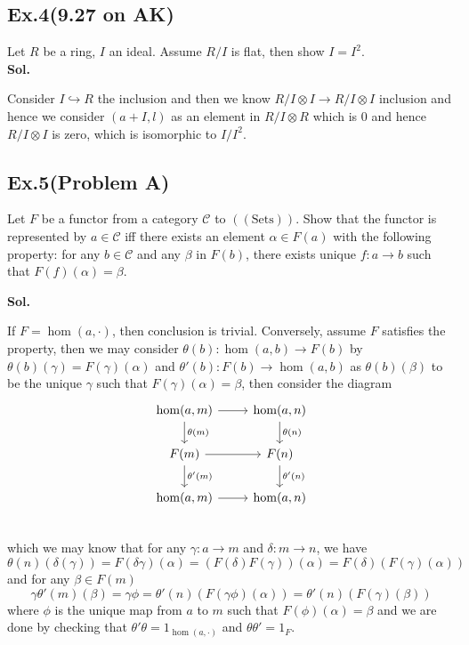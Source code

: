 \documentclass[lang=en,11pt,a4paper,citestyle =authoryear]{elegantpaper}
\begin{document}
\subsection*{Ex.4(9.27 on AK)} 
Let $R$ be a ring, $I$ an ideal. Assume $R/I$ is flat, then show $I = I^2$.
\vspace{0.5em}\\
\textbf{Sol.} \par
Consider $I\hookrightarrow R$ the inclusion and then we know $R/I \otimes I \to R/I \otimes I$ inclusion and hence we consider $(a+I,l)$ as an element in $R/I\otimes R$ which is $0$ and hence $R/I \otimes I$ is zero, which is isomorphic to $I/I^2$.
\par 
\vspace{0.5em}

\subsection*{Ex.5(Problem A)} 
Let $F$ be a functor from a category $\mathcal{C}$ to $((\text{Sets}))$. Show that the functor is represented by $a\in\mathcal{C}$ iff there exists an element $\alpha\in F(a)$ with the following property: for any $b\in\mathcal{C}$ and any $\beta$ in $F(b)$, there exists unique $f:a\to b$ such that $F(f)(\alpha) = \beta$.
\vspace{0.5em}\par
\textbf{Sol.} \par
If $F = \hom(a,\cdot)$, then conclusion is trivial. Conversely, assume $F$ satisfies the property, then we may consider $\theta(b):\hom(a,b) \to F(b)$ by $\theta(b)(\gamma) = F(\gamma)(\alpha)$ and $\theta'(b):F(b) \to \hom(a,b)$ as $\theta(b)(\beta)$ to be the unique $\gamma$ such that $F(\gamma)(\alpha) = \beta$, then consider the diagram
\[
\begin{tikzcd}
    \hom(a,m)\arrow[r]\arrow[d,"\theta(m)"] & \hom(a,n)\arrow[d,"\theta(n)"] \\    
    F(m)\arrow[r]\arrow[d,"\theta'(m)"] & F(n)\arrow[d,"\theta'(n)"] \\
    \hom(a,m)\arrow[r] & \hom(a,n) \\
\end{tikzcd}
\]
which we may know that for any $\gamma:a\to m$ and $\delta: m\to n$, we have
\[
\theta(n)(\delta(\gamma)) = F(\delta\gamma)(\alpha) = (F(\delta)F(\gamma))(\alpha) = F(\delta)(F(\gamma)(\alpha))
\]
and for any $\beta \in F(m)$
\[
\gamma\theta'(m)(\beta) = \gamma\phi = \theta'(n)(F(\gamma\phi)(\alpha)) = \theta'(n)(F(\gamma)(\beta))
\]
where $\phi$ is the unique map from $a$ to $m$ such that $F(\phi)(\alpha) = \beta$ and we are done by checking that $\theta'\theta = 1_{\hom(a,\cdot)}$ and $\theta\theta' = 1_F$.
\par 
\vspace{0.5em}
\end{document}
